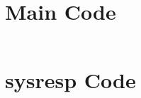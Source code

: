 \documentclass{article}
\begin{document}
\section{Main Code}
\inputminted{Matlab}{Lab1.m}
\section{sysresp Code}
\inputminted{Matlab}{sysresp.m}
\end{document}
